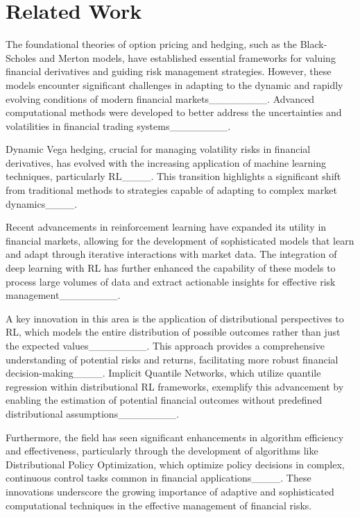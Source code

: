 \section{Related Work}
\label{related}
The foundational theories of option pricing and hedging, such as the Black-Scholes and Merton models, have established essential frameworks for valuing financial derivatives and guiding risk management strategies. However, these models encounter significant challenges in adapting to the dynamic and rapidly evolving conditions of modern financial markets________. Advanced computational methods were developed to better address the uncertainties and volatilities in financial trading systems________.

Dynamic Vega hedging, crucial for managing volatility risks in financial derivatives, has evolved with the increasing application of machine learning techniques, particularly RL____. This transition highlights a significant shift from traditional methods to strategies capable of adapting to complex market dynamics____.

Recent advancements in reinforcement learning have expanded its utility in financial markets, allowing for the development of sophisticated models that learn and adapt through iterative interactions with market data. The integration of deep learning with RL has further enhanced the capability of these models to process large volumes of data and extract actionable insights for effective risk management________.

A key innovation in this area is the application of distributional perspectives to RL, which models the entire distribution of possible outcomes rather than just the expected values________. This approach provides a comprehensive understanding of potential risks and returns, facilitating more robust financial decision-making____. Implicit Quantile Networks, which utilize quantile regression within distributional RL frameworks, exemplify this advancement by enabling the estimation of potential financial outcomes without predefined distributional assumptions________.

Furthermore, the field has seen significant enhancements in algorithm efficiency and effectiveness, particularly through the development of algorithms like Distributional Policy Optimization, which optimize policy decisions in complex, continuous control tasks common in financial applications____. These innovations underscore the growing importance of adaptive and sophisticated computational techniques in the effective management of financial risks.

